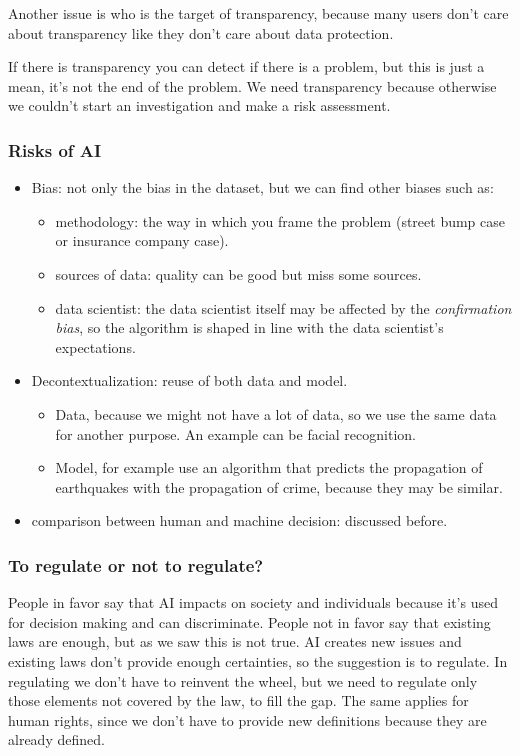Another issue is who is the target of transparency, because many users don't care about transparency like they don't care about data protection.

If there is transparency you can detect if there is a problem, but this is just a mean, it's not the end of the problem. We need transparency because otherwise we couldn't start an investigation and make a risk assessment.

\subsubsection{Risks of AI}
\begin{itemize}
    \item Bias: not only the bias in the dataset, but we can find other biases such as:
    \begin{itemize}
        \item methodology: the way in which you frame the problem (street bump case or insurance company case).
        \item sources of data: quality can be good but miss some sources.
        \item data scientist: the data scientist itself may be affected by the \textit{confirmation bias}, so the algorithm is shaped in line with the data scientist's expectations.
    \end{itemize}
    \item Decontextualization: reuse of both data and model. 
    \begin{itemize}
        \item Data, because we might not have a lot of data, so we use the same data for another purpose. An example can be facial recognition.
        \item Model, for example use an algorithm that predicts the propagation of earthquakes with the propagation of crime, because they may be similar.
    \end{itemize}
     
    \item comparison between human and machine decision: discussed before.
      
\end{itemize}

\subsubsection{To regulate or not to regulate?}
People in favor say that AI impacts on society and individuals because it's used for decision making and can discriminate. People not in favor say that existing laws are enough, but as we saw this is not true. 
AI creates new issues and existing laws don't provide enough certainties, so the suggestion is to regulate. In regulating we don't have to reinvent the wheel, but we need to regulate only those elements not covered by the law, to fill the gap. The same applies for human rights, since we don't have to provide new definitions because they are already defined.

